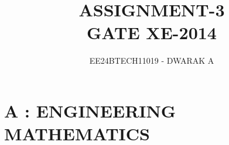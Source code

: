 \documentclass[journal]{IEEEtran}
\begin{document}

\vspace{3cm}

\title{\textbf{ASSIGNMENT-3\\GATE XE-2014}}
\author{EE24BTECH11019 - DWARAK A}
\maketitle

\bigskip

\renewcommand{\thefigure}{\theenumi}
\renewcommand{\thetable}{\theenumi}

\section*{A : ENGINEERING MATHEMATICS}

\bigskip
\end{document}
